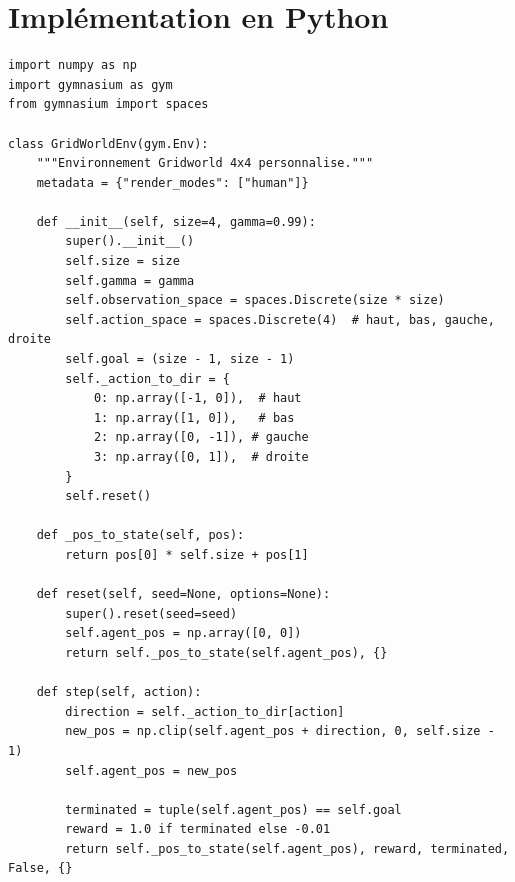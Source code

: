 \section{Impl\'ementation en Python}

\begin{codeblock}[title=\textbf{D\'efinition d'un MDP simple avec Gymnasium}]
\begin{verbatim}
import numpy as np
import gymnasium as gym
from gymnasium import spaces

class GridWorldEnv(gym.Env):
    """Environnement Gridworld 4x4 personnalise."""
    metadata = {"render_modes": ["human"]}

    def __init__(self, size=4, gamma=0.99):
        super().__init__()
        self.size = size
        self.gamma = gamma
        self.observation_space = spaces.Discrete(size * size)
        self.action_space = spaces.Discrete(4)  # haut, bas, gauche, droite
        self.goal = (size - 1, size - 1)
        self._action_to_dir = {
            0: np.array([-1, 0]),  # haut
            1: np.array([1, 0]),   # bas
            2: np.array([0, -1]), # gauche
            3: np.array([0, 1]),  # droite
        }
        self.reset()

    def _pos_to_state(self, pos):
        return pos[0] * self.size + pos[1]

    def reset(self, seed=None, options=None):
        super().reset(seed=seed)
        self.agent_pos = np.array([0, 0])
        return self._pos_to_state(self.agent_pos), {}

    def step(self, action):
        direction = self._action_to_dir[action]
        new_pos = np.clip(self.agent_pos + direction, 0, self.size - 1)
        self.agent_pos = new_pos

        terminated = tuple(self.agent_pos) == self.goal
        reward = 1.0 if terminated else -0.01
        return self._pos_to_state(self.agent_pos), reward, terminated, False, {}
\end{verbatim}
\end{codeblock}

